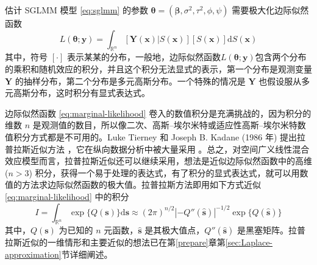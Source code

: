 \documentclass[12pt,a4paper,UTF8,twoside]{book}
\theoremstyle{definition}
\theoremstyle{definition}
\theoremstyle{definition}
\theoremstyle{remark}
\begin{document}
估计 SGLMM 模型 \eqref{eq:sglmm} 的参数
\(\boldsymbol{\theta} = (\boldsymbol{\beta},\sigma^2,\tau^2,\phi,\psi)\)
需要极大化边际似然函数 \begin{equation}
L(\boldsymbol{\theta};\mathbf{y}) = \int_{\mathbb{R}^n} [\mathbf{Y(x)}|S(\mathbf{x})][S(\mathbf{x})]\mathrm{d}S(\mathbf{x}) \label{eq:marginal-likelihood}
\end{equation} \noindent 其中，符号 \([\cdot]\)
表示某某的分布，一般地，边际似然函数\(L(\boldsymbol{\theta};\mathbf{y})\)包含两个分布的乘积和随机效应的积分，并且这个积分无法显式的表示，第一个分布是观测变量
\(\mathbf{Y}\) 的抽样分布，第二个分布是多元高斯分布。一个特殊的情况是
\(\mathbf{Y}\) 也假设服从多元高斯分布，这时积分有显式表达式。

边际似然函数 \eqref{eq:marginal-likelihood}
卷入的数值积分是充满挑战的，因为积分的维数 \(n\)
是观测值的数目，所以像二次、高斯--埃尔米特或适应性高斯--埃尔米特数值积分方式都是不可用的。Luke
Tierney 和 Joseph B. Kadane (1986 年) 提出拉普拉斯近似方法
\citep{Tierney1986}，它在纵向数据分析中被大量采用
\citep{Diggle2002Analysis}。总之，对空间广义线性混合效应模型而言，拉普拉斯近似还可以继续采用，想法是近似边际似然函数中的高维
(\(n > 3\))
积分，获得一个易于处理的表达式，有了积分的显式表达式，就可以用数值的方法求边际似然函数的极大值。拉普拉斯方法即用如下方式近似
\eqref{eq:marginal-likelihood} 中的积分 \begin{equation}
I   =  \int_{\mathbb{R}^n} \exp\{Q(\mathbf{s})\}\mathrm{d}\mathbf{s} 
  \approx  (2\pi)^{n/2} |-Q''(\hat{\mathbf{s}})|^{-1/2}\exp\{Q(\hat{\mathbf{s}})\} \label{eq:laplace-approximate}
\end{equation} \noindent 其中，\(Q(\mathbf{s})\) 为已知的 \(n\)
元函数，\(\hat{\mathbf{s}}\) 是其极大值点，\(Q''(\hat{\mathbf{s}})\)
是黑塞矩阵。拉普拉斯近似的一维情形和主要近似的想法已在第\ref{prepare}章第\ref{sec:Laplace-approximation}节详细阐述。
\end{document}
